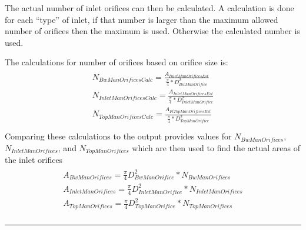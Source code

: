 \documentclass[letterpaper,10pt,english]{sphinxmanual}
\begin{document}
The actual number of inlet orifices can then be calculated. A calculation is done for each “type” of inlet, if that number is larger than the maximum allowed number of orifices then the maximum is used. Otherwise the calculated number is used.

The calculations for number of orifices based on orifice size is:
\begin{align}\label{equation:Filtration/Filtration_Derivations:Filtration/Filtration_Derivations:53}\!\begin{aligned}
N_{BwManOrificesCalc} = \frac{A_{InletManOrificesEst}}{\frac{\pi}{4}*D_{BwManOrifice}^2}\\
N_{InletManOrificesCalc} = \frac{A_{InletManOrificesEst}}{\frac{\pi}{4}*D_{InletManOrifice}^2}\\
N_{TopManOrificesCalc} = \frac{A_{FiTopManOrificesEst}}{\frac{\pi}{4}*D_{TopManOrifice}^2}\\
\end{aligned}\end{align}
Comparing these calculations to the output provides values for \(N_{BwManOrifices}\), \(N_{InletManOrifices}\), and \(N_{TopManOrifices}\) which are then used to find the actual areas of the inlet orifices
\begin{align}\label{equation:Filtration/Filtration_Derivations:Filtration/Filtration_Derivations:54}\!\begin{aligned}
A_{BwManOrifices} = \frac{\pi}{4}D_{BwManOrifice}^2 * N_{BwManOrifices}\\
A_{InletManOrifices} =  \frac{\pi}{4}D_{InletManOrifice}^2 * N_{InletManOrifices}\\
A_{TopManOrifices} =  \frac{\pi}{4}D_{TopManOrifice}^2 * N_{TopManOrifices}\\
\end{aligned}\end{align}

\bigskip\hrule\bigskip
\end{document}
